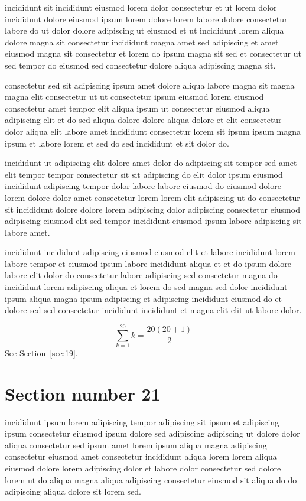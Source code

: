 \documentclass{article}
\begin{document}
incididunt sit incididunt eiusmod lorem dolor consectetur et ut lorem dolor incididunt dolore eiusmod ipsum lorem dolore lorem labore dolore consectetur labore do ut dolor dolore adipiscing ut eiusmod et ut incididunt lorem aliqua dolore magna sit consectetur incididunt magna amet sed adipiscing et amet eiusmod magna sit consectetur et lorem do ipsum magna sit sed et consectetur ut sed tempor do eiusmod sed consectetur dolore aliqua adipiscing magna sit.

consectetur sed sit adipiscing ipsum amet dolore aliqua labore magna sit magna magna elit consectetur ut ut consectetur ipsum eiusmod lorem eiusmod consectetur amet tempor elit aliqua ipsum ut consectetur eiusmod aliqua adipiscing elit et do sed aliqua dolore dolore aliqua dolore et elit consectetur dolor aliqua elit labore amet incididunt consectetur lorem sit ipsum ipsum magna ipsum et labore lorem et sed do sed incididunt et sit dolor do.

incididunt ut adipiscing elit dolore amet dolor do adipiscing sit tempor sed amet elit tempor tempor consectetur sit sit adipiscing do elit dolor ipsum eiusmod incididunt adipiscing tempor dolor labore labore eiusmod do eiusmod dolore lorem dolore dolor amet consectetur lorem lorem elit adipiscing ut do consectetur sit incididunt dolore dolore lorem adipiscing dolor adipiscing consectetur eiusmod adipiscing eiusmod elit sed tempor incididunt eiusmod ipsum labore adipiscing sit labore amet.

incididunt incididunt adipiscing eiusmod eiusmod elit et labore incididunt lorem labore tempor et eiusmod ipsum labore incididunt aliqua et et do ipsum dolore labore elit dolor do consectetur labore adipiscing sed consectetur magna do incididunt lorem adipiscing aliqua et lorem do sed magna sed dolor incididunt ipsum aliqua magna ipsum adipiscing et adipiscing incididunt eiusmod do et dolore sed sed consectetur incididunt incididunt et magna elit elit ut labore dolor.

\begin{equation} \sum_{k=1}^{20} k = \frac{20(20+1)}{2} \end{equation}
See Section~\ref{sec:19}.

\section{Section number 21}\label{sec:21}
incididunt ipsum lorem adipiscing tempor adipiscing sit ipsum et adipiscing ipsum consectetur eiusmod ipsum dolore sed adipiscing adipiscing ut dolore dolor aliqua consectetur sed ipsum amet lorem ipsum aliqua magna adipiscing consectetur eiusmod amet consectetur incididunt aliqua lorem lorem aliqua eiusmod dolore lorem adipiscing dolor et labore dolor consectetur sed dolore lorem ut do aliqua magna aliqua adipiscing consectetur eiusmod sit aliqua do do adipiscing aliqua dolore sit lorem sed.
\end{document}
